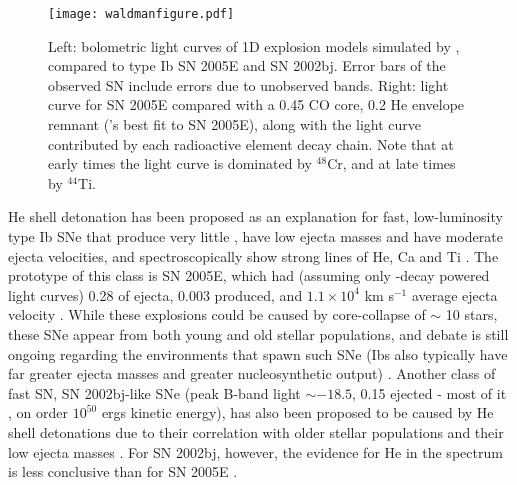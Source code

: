 


\begin{figure}
\centerline{\texttt{[image: waldmanfigure.pdf]}}
\caption{Left: bolometric light curves of 1D explosion models simulated by \citeauthor{wald+10}, compared to type Ib SN 2005E and SN 2002bj.  Error bars of the observed SN include errors due to unobserved bands.  Right: light curve for SN 2005E compared with a 0.45 {\Msun} CO core, 0.2 {\Msun} He envelope remnant (\citeauthor{wald+10}'s best fit to SN 2005E), along with the light curve contributed by each radioactive element decay chain.  Note that at early times the light curve is dominated by $^{48}$Cr, and at late times by $^{44}$Ti.}
\label{waldmanfigure}
\end{figure}

He shell detonation has been proposed as an explanation for fast, low-luminosity type Ib SNe that produce very little {\Ni}, have low ejecta masses and have moderate ejecta velocities, and spectroscopically show strong lines of He, Ca and Ti \citep{pere+10a,wald+10}.  The prototype of this class is SN 2005E, which had (assuming only {\Ni}-decay powered light curves) 0.28 {\Msun} of ejecta, 0.003 {\Ni} produced, and $1.1 \times 10^{4}$ km s$^{-1}$ average ejecta velocity \citep{pere+10a}.  While these explosions could be caused by core-collapse of $\sim$ 10 {\Msun} stars, these SNe appear from both young and old stellar populations, and debate is still ongoing regarding the environments that spawn such SNe (Ibs also typically have far greater ejecta masses and greater nucleosynthetic output) \citep{kawa+10,pere+10a,wald+10,pere+11}.  Another class of fast SN, SN 2002bj-like SNe (peak B-band light $\sim -18.5$, 0.15 {\Msun} ejected - most of it {\Ni}, on order $10^{50}$ ergs kinetic energy), has also been proposed to be caused by He shell detonations due to their correlation with older stellar populations and their low ejecta masses \citep{pere+10b}. For SN 2002bj, however, the evidence for He in the spectrum is less conclusive than for SN 2005E \citep{pere+10b, pozn+10}.

